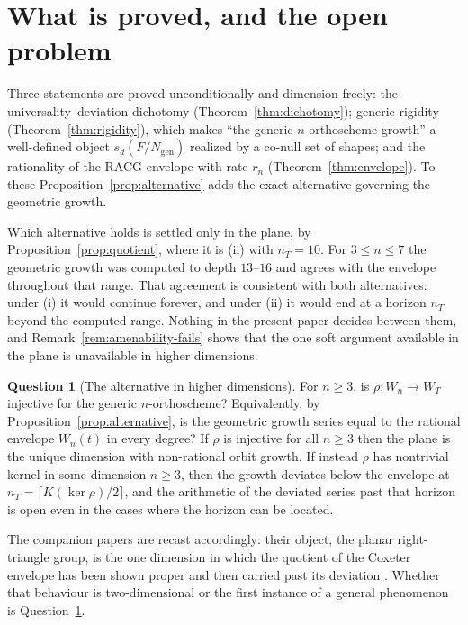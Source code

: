 \documentclass[11pt]{article}
\theoremstyle{definition}
\newtheorem{question}[theorem]{Question}
\begin{document}
\section{What is proved, and the open problem}

Three statements are proved unconditionally and dimension-freely: the universality--deviation dichotomy
(Theorem~\ref{thm:dichotomy}); generic rigidity (Theorem~\ref{thm:rigidity}), which makes ``the generic
$n$-orthoscheme growth'' a well-defined object $s_d(F/N_{\mathrm{gen}})$ realized by a co-null set of
shapes; and the rationality of the RACG envelope with rate $r_n$ (Theorem~\ref{thm:envelope}). To these
Proposition~\ref{prop:alternative} adds the exact alternative governing the geometric growth.

Which alternative holds is settled only in the plane, by Proposition~\ref{prop:quotient}, where it is
(ii) with $n_T=10$. For $3\le n\le7$ the geometric growth was computed to depth $13$--$16$ and agrees
with the envelope throughout that range. That agreement is consistent with both alternatives: under (i)
it would continue forever, and under (ii) it would end at a horizon $n_T$ beyond the computed range.
Nothing in the present paper decides between them, and Remark~\ref{rem:amenability-fails} shows that the
one soft argument available in the plane is unavailable in higher dimensions.

\begin{question}[The alternative in higher dimensions]
\label{q:transc}
For $n\ge3$, is $\rho\colon W_n\to W_T$ injective for the generic $n$-orthoscheme? Equivalently, by
Proposition~\ref{prop:alternative}, is the geometric growth series equal to the rational envelope
$W_n(t)$ in every degree? If $\rho$ is injective for all $n\ge3$ then the plane is the unique dimension
with non-rational orbit growth. If instead $\rho$ has nontrivial kernel in some dimension $n\ge3$, then
the growth deviates below the envelope at $n_T=\lceil K(\ker\rho)/2\rceil$, and the arithmetic of the
deviated series past that horizon is open even in the cases where the horizon can be located.
\end{question}

The companion papers are recast accordingly: their object, the planar right-triangle group, is the one
dimension in which the quotient of the Coxeter envelope has been shown proper and then carried past its
deviation \cite{Bonfioli1,Bonfioli1b}. Whether that behaviour is two-dimensional or the first instance of
a general phenomenon is Question~\ref{q:transc}.
\end{document}
